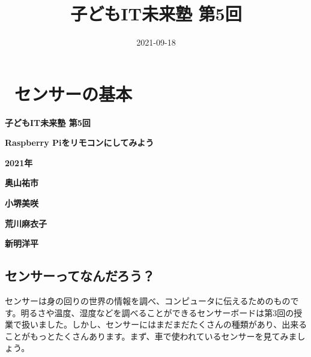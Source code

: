 \documentclass[a4paper,dvipdfmx]{jarticle}
\title{子どもIT未来塾 第5回}
\author{}
\date{2021-09-18}
\begin{document}
\clearpage\setcounter{page}{1}\pagestyle{Standard}
\thispagestyle{FirstPage}

\bigskip

\clearpage\section[\ センサーの基本]{%
\ センサーの基本}

\begin{minipage}{17.369cm}
\clearpage\setcounter{page}{1}\pagestyle{Standard}
\thispagestyle{FirstPage}
{\centering\bfseries
子どもIT未来塾 第5回
\par}

{\centering\bfseries
Raspberry Piをリモコンにしてみよう
\par}

{\centering\bfseries
2021年
\par}


\bigskip

{\centering\bfseries
奥山祐市
\par}

{\centering\bfseries
小堺美咲
\par}

{\centering\bfseries
荒川麻衣子
\par}

{\centering\bfseries
新明洋平
\par}
\end{minipage}
\subsection[センサーってなんだろう？]{\rmfamily
センサーってなんだろう？}
{\mdseries
センサーは身の回りの世界の情報を調べ、コンピュータに伝えるためのものです。明るさや温度、湿度などを調べることができるセンサーボードは第3回の授業で扱いました。しかし、センサーにはまだまだたくさんの種類があり、出来ることがもっとたくさんあります。まず、車で使われているセンサーを見てみましょう。}
\end{document}
